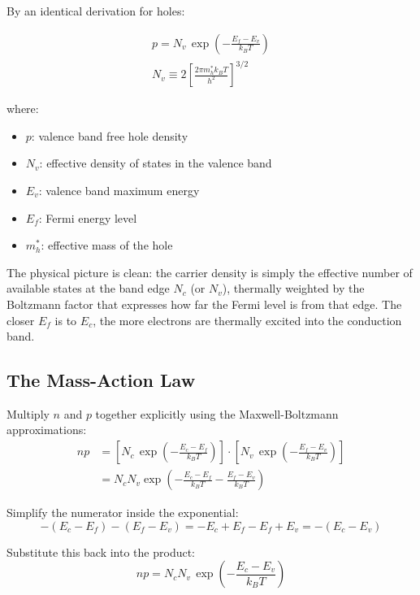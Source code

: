By an identical derivation for holes:
\begin{keyresult}
    \begin{gather}
        p = N_v\,\exp\!\left(-\frac{E_f - E_v}{k_B T}\right) \\[1ex]
        N_v \equiv 2\!\left[\frac{2\pi m^*_h k_B T}{h^2}\right]^{\!3/2}
    \end{gather}
\end{keyresult}
where:
\begin{itemize}
    \item $p$: valence band free hole density
    \item $N_v$: effective density of states in the valence band
    \item $E_v$: valence band maximum energy
    \item $E_f$: Fermi energy level
    \item $m^*_h$: effective mass of the hole
\end{itemize}

The physical picture is clean: the carrier density is simply the effective number of available states at the band edge $N_c$ (or $N_v$), thermally weighted by the Boltzmann factor that expresses how far the Fermi level is from that edge. The closer $E_f$ is to $E_c$, the more electrons are thermally excited into the conduction band.

\subsection{The Mass-Action Law}

Multiply $n$ and $p$ together explicitly using the Maxwell-Boltzmann approximations:
\begin{align*}
    np & = \left[ N_c\,\exp\!\left(-\frac{E_c - E_f}{k_B T}\right) \right] \cdot \left[ N_v\,\exp\!\left(-\frac{E_f - E_v}{k_B T}\right) \right] \\
       & = N_c N_v \exp\!\left(-\frac{E_c - E_f}{k_B T} - \frac{E_f - E_v}{k_B T}\right)
\end{align*}

Simplify the numerator inside the exponential:
\begin{equation*}
    -(E_c - E_f) - (E_f - E_v) = -E_c + E_f - E_f + E_v = -(E_c - E_v)
\end{equation*}

Substitute this back into the product:
\begin{equation*}
    np = N_c N_v\,\exp\!\left(-\frac{E_c - E_v}{k_B T}\right)
\end{equation*}

